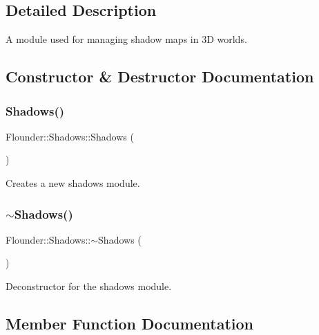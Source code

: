 \subsection{Detailed Description}
A module used for managing shadow maps in 3D worlds. 



\subsection{Constructor \& Destructor Documentation}
\mbox{\label{class_flounder_1_1_shadows_af01b62b01f31c66a455a601400eb5486}} 
\subsubsection{\texorpdfstring{Shadows()}{Shadows()}}
{\footnotesize\ttfamily Flounder\+::\+Shadows\+::\+Shadows (\begin{DoxyParamCaption}{ }\end{DoxyParamCaption})}



Creates a new shadows module. 

\mbox{\label{class_flounder_1_1_shadows_af1377013947d8ac915e397933c8a6c3f}} 
\subsubsection{\texorpdfstring{$\sim$\+Shadows()}{~Shadows()}}
{\footnotesize\ttfamily Flounder\+::\+Shadows\+::$\sim$\+Shadows (\begin{DoxyParamCaption}{ }\end{DoxyParamCaption})}



Deconstructor for the shadows module. 



\subsection{Member Function Documentation}
\mbox{\label{class_flounder_1_1_shadows_a789d274c9a6cf64eea8f36daa045e119}} 
